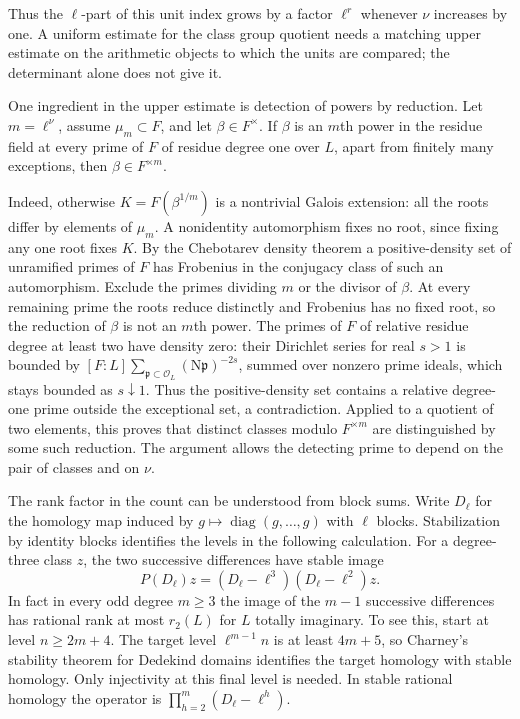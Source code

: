 \documentclass[11pt]{amsart}
\theoremstyle{definition}
\theoremstyle{remark}
\begin{document}
Thus the $\ell$-part of this unit index grows by a factor
$\ell^r$ whenever $\nu$ increases by one. A uniform estimate for the
class group quotient needs a matching upper estimate on the arithmetic
objects to which the units are compared; the determinant alone
does not give it.

One ingredient in the upper estimate is detection of powers by
reduction. Let $m=\ell^\nu$, assume $\mu_m\subset F$, and let
$\beta\in F^\times$. If $\beta$ is an $m$th power in the residue
field at every prime of $F$ of residue degree one over $L$, apart
from finitely many exceptions, then $\beta\in F^{\times m}$.

Indeed, otherwise $K=F(\beta^{1/m})$ is a nontrivial Galois extension:
all the roots differ by elements of $\mu_m$. A nonidentity automorphism
fixes no root, since fixing any one root fixes $K$. By the Chebotarev
density theorem a positive-density set of unramified primes of $F$
has Frobenius in the conjugacy class of such an automorphism. Exclude
the primes dividing $m$ or the divisor of $\beta$. At every remaining
prime the roots reduce distinctly and Frobenius has no fixed root,
so the reduction of $\beta$ is not an $m$th power. The primes of $F$
of relative residue degree at least two have density zero: their
Dirichlet series for real $s>1$ is bounded by
$[F:L]\sum_{\mathfrak p\subset\mathcal O_L}
(\mathrm N\mathfrak p)^{-2s}$, summed over nonzero prime ideals,
which stays bounded as $s\downarrow1$. Thus the positive-density set
contains a relative degree-one prime outside the exceptional set,
a contradiction. Applied to a quotient of two elements, this proves
that distinct classes modulo $F^{\times m}$ are distinguished by
some such reduction. The argument allows the detecting prime to
depend on the pair of classes and on $\nu$.

The rank factor in the count can be understood from block sums.
Write $D_\ell$ for the homology map induced by $g\mapsto
\operatorname{diag}(g,\ldots,g)$ with $\ell$ blocks. Stabilization by
identity blocks identifies the levels in the following calculation.
For a degree-three class $z$, the two successive differences have
stable image
\[
 P(D_\ell)z=(D_\ell-\ell^3)(D_\ell-\ell^2)z.
\]
In fact in every odd degree $m\ge3$ the image of the $m-1$
successive differences has rational rank at most $r_2(L)$ for $L$
totally imaginary. To see this, start at level $n\ge 2m+4$. The
target level $\ell^{m-1}n$ is at least $4m+5$, so Charney's stability
theorem for Dedekind domains identifies the target homology with
stable homology. Only injectivity at this final level is needed.
In stable rational homology the operator is
$\prod_{h=2}^m(D_\ell-\ell^h)$.
\end{document}
